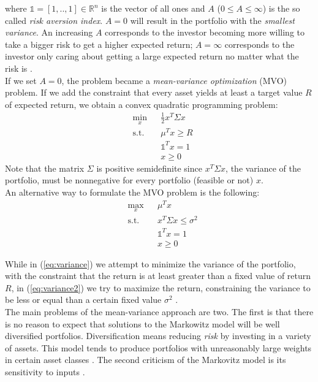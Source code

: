 where $\mathds{1} = [1, .., 1] \in \mathbb{R}^n$ is the vector of all ones and $A$ ($0 \leq A \leq \infty$) is the so called \textit{risk aversion index}. $A = 0$ will result in the portfolio with the \textit{smallest variance}. An increasing $A$ corresponds to the investor becoming more willing to take a bigger risk to get a higher expected return; $A = \infty$ corresponds to the investor only caring about getting a large expected return no matter what the risk is \cite{markovitz}.\\
If we set $A=0$, the problem became a \textit{mean-variance
optimization} (MVO) problem. If we add the constraint that every asset yields at least a target value $R$ of expected return, we obtain a convex quadratic programming problem:
\begin{equation}\label{eq:variance}
\begin{aligned}
&\min_x &&\frac{1}{2}x^T \Sigma x\\
&\text{s.t.}
&&\mu^T x \geq R\\
&&&\mathds{1}^T x=1\\
&&&x \geq 0
\end{aligned}
\end{equation}
Note that the matrix $\Sigma$ is positive semidefinite since $x^T \Sigma x$, the variance of the portfolio, must be nonnegative for every portfolio (feasible or not) $x$.\\
An alternative way to formulate the MVO problem is the following:
\begin{equation}\label{eq:variance2}
\begin{aligned}
&\max_x &&\mu^Tx\\
&\text{s.t.}
&&x^T \Sigma x \leq \sigma^2\\
&&&\mathds{1}^T x=1\\
&&&x \geq 0
\end{aligned}
\end{equation}

While in (\ref{eq:variance}) we attempt to minimize the variance of the portfolio, with the constraint that the return is at least greater than a fixed value of return $R$, in (\ref{eq:variance2}) we try to maximize the return, constraining the variance to be less or equal than a certain fixed value $\sigma^2$ \cite{libro}.\\
The main problems of the mean-variance approach are two. The first is that there is no reason to expect that solutions to the Markowitz model will be well diversified portfolios. Diversification means reducing \textit{risk} by investing in a variety of assets. This model tends to produce portfolios with unreasonably large weights in certain asset classes \cite{libro}. The second criticism of the Markovitz model is its sensitivity to inputs \cite{tutuncu}.